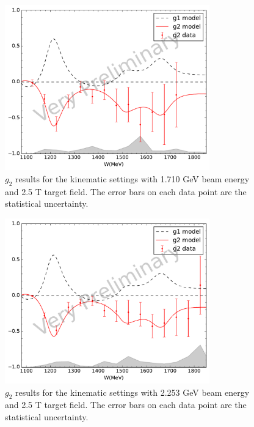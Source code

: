 \begin{figure}[p!]
  \centering
  \includegraphics[width=0.79\textwidth]{figs/g1g2-model-17102590.pdf}
  \caption[$g_2$ results with $E=1.710$ GeV and $B=2.5$ T.]{$g_2$ results for the kinematic settings with 1.710 GeV beam energy and 2.5 T target field. The error bars on each data point are the statistical uncertainty. \label{C8S4F2}}
\end{figure}

\begin{figure}[p!]
  \centering
  \includegraphics[width=0.79\textwidth]{figs/g1g2-model-22532590.pdf}
  \caption[$g_2$ results with $E=2.253$ GeV and $B=2.5$ T.]{$g_2$ results for the kinematic settings with 2.253 GeV beam energy and 2.5 T target field. The error bars on each data point are the statistical uncertainty. \label{C8S4F3}}
\end{figure}

